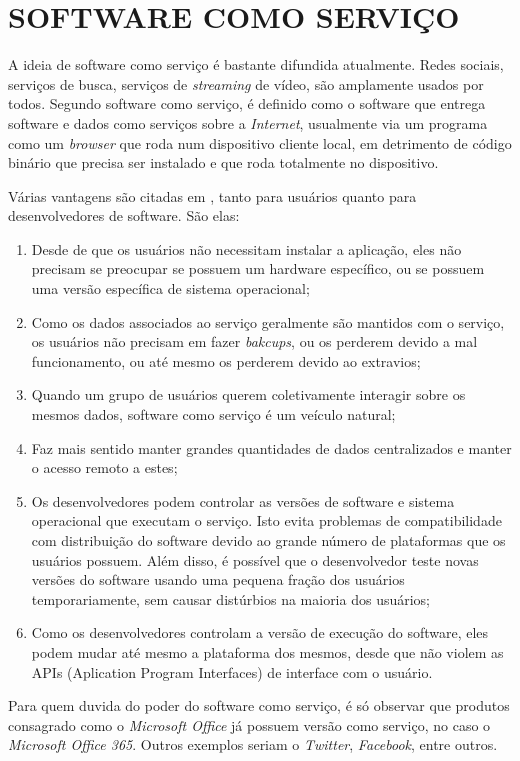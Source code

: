 \section{SOFTWARE COMO SERVIÇO} 

A ideia de software como serviço é bastante difundida atualmente. 
Redes sociais, serviços de busca, serviços de \emph{streaming} de vídeo, são amplamente usados por todos. 
Segundo  software como serviço, é definido como o software que entrega software e dados como serviços sobre a \emph{Internet}, usualmente via um programa como um \emph{browser} que roda num dispositivo cliente local, em detrimento de código binário que precisa ser instalado e que roda totalmente no dispositivo.

Várias vantagens são citadas em , tanto para usuários quanto para desenvolvedores de software. São elas:

\begin{enumerate}
	\item Desde de que os usuários não necessitam instalar a aplicação, eles não precisam se preocupar se possuem um hardware específico, ou se possuem uma versão específica de sistema operacional;
	\item Como os dados associados ao serviço geralmente são mantidos com o serviço, os usuários não precisam em fazer \emph{bakcups}, ou os perderem devido a mal funcionamento, ou até mesmo os perderem devido ao extravios;
	\item Quando um grupo de usuários querem coletivamente interagir sobre os mesmos dados, software como serviço é um veículo natural;
	\item Faz mais sentido manter grandes quantidades de dados centralizados e manter o acesso remoto a estes;
	\item Os desenvolvedores podem controlar as versões de software e sistema operacional que executam o serviço. Isto evita problemas de compatibilidade com distribuição do software devido ao grande número de plataformas que os usuários possuem. Além disso, é possível que o desenvolvedor teste novas versões do software usando uma pequena fração dos usuários temporariamente, sem causar distúrbios na maioria dos usuários;
	\item Como os desenvolvedores controlam a versão de execução do software, eles podem mudar até mesmo a plataforma dos mesmos, desde que não violem as APIs (Aplication Program Interfaces) de interface com o usuário.
\end{enumerate}

	Para quem duvida do poder do software como serviço, é só observar que produtos consagrado como o \emph{Microsoft Office} já possuem versão como serviço, no caso o \emph{Microsoft Office 365}. Outros exemplos seriam o \emph{Twitter}, \emph{Facebook}, entre outros.

